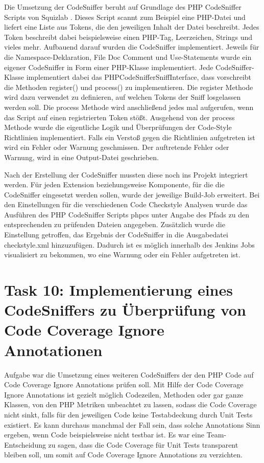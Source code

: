 \documentclass[11pt,a4paper]{article}
\begin{document}
Die Umsetzung der CodeSniffer beruht auf Grundlage des PHP CodeSniffer Scripts von Squizlab \cite{squizlab}. 
Dieses Script scannt zum Beispiel eine PHP-Datei und liefert
eine Liste aus Tokens, die den jeweiligen Inhalt der Datei beschreibt. Jedes Token beschreibt dabei
beispielsweise einen PHP-Tag, Leerzeichen, Strings und vieles mehr. Aufbauend darauf
wurden die CodeSniffer implementiert. Jeweils für die Namespace-Deklaration, File Doc Comment
und Use-Statements wurde ein eigener CodeSniffer in Form einer PHP-Klasse implementiert.
Jede CodeSniffer-Klasse implementiert dabei das PHPCodeSnifferSniffInterface, dass vorschreibt
die Methoden register() und process() zu implementieren. Die register Methode wird dazu 
verwendet zu definieren, auf welchen Tokens der Sniff losgelassen werden soll.
Die process Methode wird anschließend jedes mal aufgerufen, wenn das Script auf einen registrierten
Token stößt. Ausgehend von der process Methode wurde die eigentliche Logik und Überprüfungen
der Code-Style Richtlinien implementiert. Falls ein Verstoß gegen die Richtlinien 
aufgetreten ist wird ein Fehler oder Warnung geschmissen.
Der auftretende Fehler oder Warnung, wird in eine Output-Datei geschrieben.

Nach der Erstellung der CodeSniffer mussten diese noch ins Projekt integriert werden.
Für jeden Extension beziehungsweise Komponente, für die die CodeSniffer eingesetzt werden sollen,
wurde der jeweilige Build-Job erweitert. Bei den Einstellungen für die verschiedenen Code Checkstyle Analysen
wurde das Ausführen des PHP CodeSniffer Scripts phpcs unter Angabe des Pfads zu den entsprechenden zu
prüfenden Dateien angegeben. Zusätzlich wurde die Einstellung getroffen, das Ergebnis der CodeSniffer
in die Ausgabedatei checkstyle.xml hinzuzufügen. Dadurch ist es möglich innerhalb des Jenkins Jobs
visualisiert zu bekommen, wo eine Warnung oder ein Fehler aufgetreten ist.



\section{Task 10: Implementierung eines CodeSniffers zu Überprüfung von Code Coverage Ignore Annotationen}

Aufgabe war die Umsetzung eines weiteren CodeSniffers der den PHP Code auf Code Coverage Ignore Annotations prüfen soll.
Mit Hilfe der Code Coverage Ignore Annotations ist gezielt möglich Codezeilen, Methoden oder gar ganze 
Klassen, von den PHP Metriken unbeachtet zu lassen, sodass die Code Coverage nicht sinkt, falls für
den jeweiligen Code keine Testabdeckung durch Unit Tests existiert. 
Es kann durchaus manchmal der Fall sein, dass solche Annotations Sinn ergeben, wenn Code beispielsweise
nicht testbar ist. Es war eine Team-Entscheidung zu sagen, dass die Code Coverage für Unit Tests transparent bleiben
soll, um somit auf Code Coverage Ignore Annotations zu verzichten.
\end{document}
